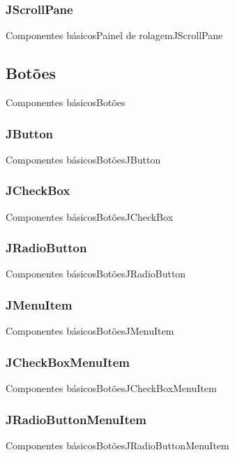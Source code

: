 \documentclass[10pt]{beamer}
\begin{document}
\subsubsection{JScrollPane}
\begin{frame}{Componentes básicos}{Painel de rolagem}{JScrollPane}
\end{frame}{}
\subsection{Botões}
\begin{frame}{Componentes básicos}{Botões}
\end{frame}{}
\subsubsection{JButton}
\begin{frame}{Componentes básicos}{Botões}{JButton}
\end{frame}{}
\subsubsection{JCheckBox}
\begin{frame}{Componentes básicos}{Botões}{JCheckBox}
\end{frame}{}
\subsubsection{JRadioButton}
\begin{frame}{Componentes básicos}{Botões}{JRadioButton}
\end{frame}{}
\subsubsection{JMenuItem}
\begin{frame}{Componentes básicos}{Botões}{JMenuItem}
\end{frame}{}
\subsubsection{JCheckBoxMenuItem}
\begin{frame}{Componentes básicos}{Botões}{JCheckBoxMenuItem}
\end{frame}{}
\subsubsection{JRadioButtonMenuItem}
\begin{frame}{Componentes básicos}{Botões}{JRadioButtonMenuItem}
\end{frame}{}
\end{document}
